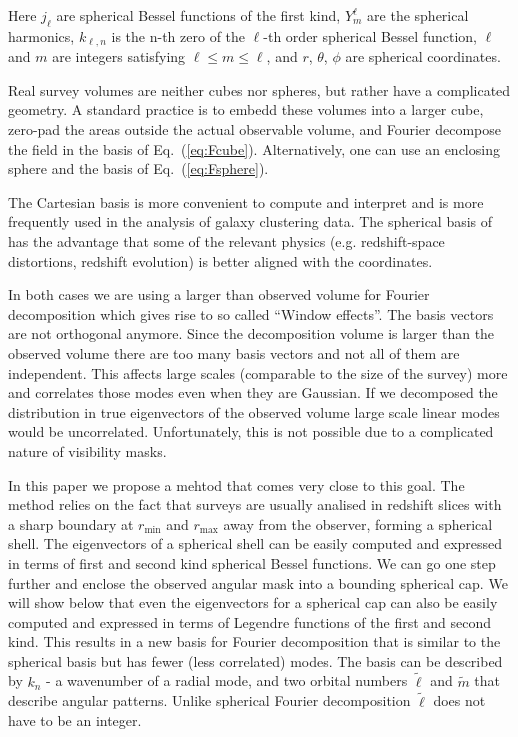\documentclass[fleqn,usenatbib]{mnras}
\begin{document}
Here $j_\ell$ are spherical Bessel functions of the first kind, $Y^\ell_m$ are the
spherical harmonics, $k_{\ell,n}$ is the n-th zero of the $\ell$-th order
spherical Bessel function, $\ell$ and $m$ are integers satisfying $\ell \leq
m \leq \ell$, and $r$, $\theta$, $\phi$ are spherical coordinates.

Real survey volumes are neither cubes nor spheres, but rather have a complicated
geometry. A standard practice is to embedd these volumes into a larger cube,
zero-pad the areas outside the actual observable volume, and Fourier decompose the
field in the basis of Eq.~(\ref{eq:Fcube}). Alternatively, one can use an
enclosing sphere and the basis of Eq.~(\ref{eq:Fsphere}).

The Cartesian basis is more convenient to compute and interpret and
is more frequently used in the analysis of galaxy clustering data. The spherical
basis of has the advantage that some of the relevant physics (e.g. redshift-space
distortions, redshift evolution) is better aligned with the coordinates.

In both cases we are using a larger than observed volume for Fourier
decomposition which gives rise to so called ``Window effects''. The basis vectors
are not orthogonal anymore. Since the decomposition volume is larger than the
observed volume there are too many basis vectors and not all of them are
independent. This affects large scales (comparable to the size of the survey) more
and correlates those modes even when they are Gaussian. If we decomposed the
distribution in true eigenvectors of the observed volume large scale linear modes
would be uncorrelated. Unfortunately, this is not possible due to a complicated
nature of visibility masks.

In this paper we propose a mehtod that comes very close to this goal. The method
relies on the fact that surveys are usually analised in redshift slices with a
sharp boundary at $r_\mathrm{min}$ and $r_\mathrm{max}$ away from the observer,
forming a spherical shell. The  eigenvectors of a spherical shell
can be easily computed and expressed in terms of first and second kind spherical
Bessel functions. We can go one step further and enclose the observed angular mask
into a bounding spherical cap. We will show below that even the 
eigenvectors for a spherical cap can also be easily computed and expressed in
terms of Legendre functions of the first and second kind. This results in a new
basis for Fourier decomposition that is similar to the spherical basis but has
fewer (less correlated) modes. The basis can be described by $k_n$ - a wavenumber
of a radial mode, and two orbital numbers $\tilde{\ell}$ and $\tilde{m}$ that
describe angular patterns. Unlike spherical Fourier decomposition $\tilde{\ell}$
does not have to be an integer.
\end{document}
